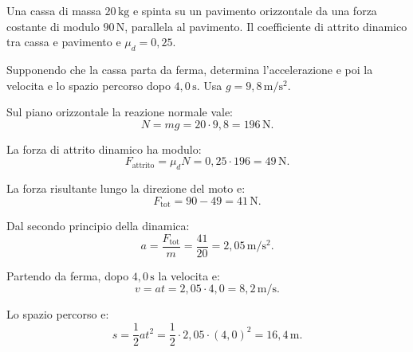 
\begin{esercizio}
Una cassa di massa \(20\,\mathrm{kg}\) e spinta su un pavimento orizzontale
da una forza costante di modulo \(90\,\mathrm{N}\), parallela al pavimento.
Il coefficiente di attrito dinamico tra cassa e pavimento e
\(\mu_d=0{,}25\).

Supponendo che la cassa parta da ferma, determina l'accelerazione e poi la
velocita e lo spazio percorso dopo \(4{,}0\,\mathrm{s}\). Usa
\(g=9{,}8\,\mathrm{m/s^2}\).
\end{esercizio}

\begin{soluzione}
Sul piano orizzontale la reazione normale vale:
\[
N=mg=20\cdot 9{,}8=196\,\mathrm{N}.
\]

La forza di attrito dinamico ha modulo:
\[
F_\text{attrito}=\mu_d N=0{,}25\cdot 196=49\,\mathrm{N}.
\]

La forza risultante lungo la direzione del moto e:
\[
F_\text{tot}=90-49=41\,\mathrm{N}.
\]

Dal secondo principio della dinamica:
\[
a=\frac{F_\text{tot}}{m}=\frac{41}{20}=2{,}05\,\mathrm{m/s^2}.
\]

Partendo da ferma, dopo \(4{,}0\,\mathrm{s}\) la velocita e:
\[
v=at=2{,}05\cdot 4{,}0=8{,}2\,\mathrm{m/s}.
\]

Lo spazio percorso e:
\[
s=\frac{1}{2}at^2
=\frac{1}{2}\cdot 2{,}05\cdot (4{,}0)^2
=16{,}4\,\mathrm{m}.
\]
\end{soluzione}

